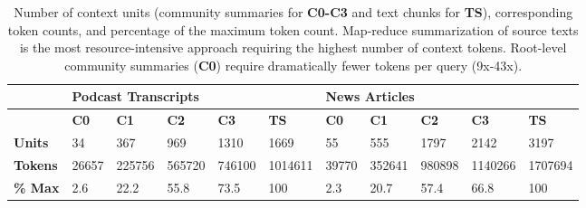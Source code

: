 
\begin{table}

    \caption{Number of context units (community summaries for \textbf{C0-C3} and text chunks for \textbf{TS}), corresponding token counts, and percentage of the maximum token count. Map-reduce summarization of source texts is the most resource-intensive approach requiring the highest number of context tokens. Root-level community summaries (\textbf{C0}) require dramatically fewer tokens per query (9x-43x).}
    \small
    \centering
    \def\arraystretch{1.25}%
    \begin{tabularx}{\textwidth}{lXXXXXXXXXX} \hline           
    & \multicolumn{5}{l}{\textbf{Podcast Transcripts}} & \multicolumn{5}{l}{\textbf{News Articles}} \\ \hline 
    & \textbf{C0} & \textbf{C1} & \textbf{C2} & \textbf{C3} & \textbf{TS} & \textbf{C0} & \textbf{C1} & \textbf{C2} & \textbf{C3} & \textbf{TS} \\ \hline 
    \textbf{Units} & 34 & 367 & 969 & 1310 & 1669 & 55 & 555 & 1797 & 2142 & 3197 \\ \hline 
    \textbf{Tokens} & 26657 & 225756 & 565720 & 746100 & 1014611 & 39770 & 352641 & 980898 & 1140266 & 1707694 \\ \hline
    \textbf{\% Max} & 2.6 & 22.2 & 55.8 & 73.5 & 100 & 2.3 & 20.7 & 57.4 & 66.8 & 100 \\ \hline
    \end{tabularx}

    \label{tab:community summaries}
\end{table}


